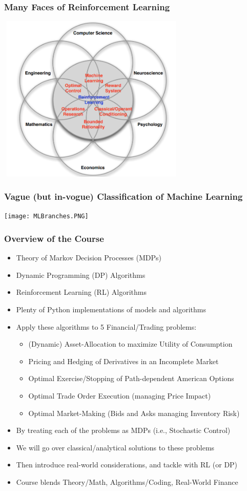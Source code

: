 \documentclass[handout]{beamer}
\begin{document}
\begin{frame}
\frametitle{Many Faces of Reinforcement Learning}
\includegraphics[width=9cm, height=8cm]{many_faces_of_RL.PNG}
\end{frame}

\begin{frame}
\frametitle{Vague (but in-vogue) Classification of Machine Learning}
\texttt{[image: MLBranches.PNG]}
\end{frame}

\begin{frame}
\frametitle{Overview of the Course}
\pause
\begin{itemize}[<+->]
\item Theory of Markov Decision Processes (MDPs)
\item Dynamic Programming (DP) Algorithms
\item Reinforcement Learning (RL) Algorithms
\item Plenty of Python implementations of models and algorithms
\item Apply these algorithms to 5 Financial/Trading problems:
\begin{itemize}
\item (Dynamic) Asset-Allocation to maximize Utility of Consumption
\item Pricing and Hedging of Derivatives in an Incomplete Market
\item Optimal Exercise/Stopping of Path-dependent American Options
\item Optimal Trade Order Execution (managing Price Impact)
\item Optimal Market-Making (Bids and Asks managing Inventory Risk)
\end{itemize}
\item By treating each of the problems as MDPs (i.e., Stochastic Control)
\item We will go over classical/analytical solutions to these problems
\item Then introduce real-world considerations, and tackle with RL (or DP)
\item Course blends Theory/Math, Algorithms/Coding, Real-World Finance
\end{itemize}
\end{frame}
\end{document}
